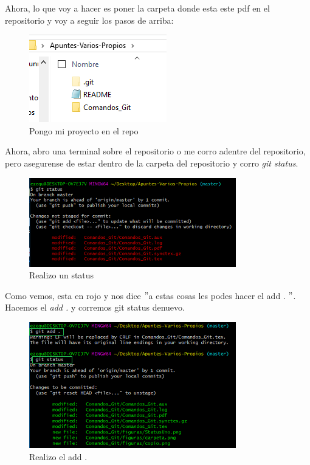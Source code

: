 \documentclass[10pt,journal,compsoc]{IEEEtran}
\begin{document}
Ahora, lo que voy a hacer es poner la carpeta donde esta este pdf en el repositorio y voy a seguir los pasos de arriba:
\begin{figure}[H]
  \begin{center}
	 \includegraphics{figuras/Copio.png}
	 \centering
	 \renewcommand{\arraystretch}{1.3}
	 \caption{Pongo mi proyecto en el repo}
  \end{center}
\end{figure}
Ahora, abro una terminal sobre el repositorio o me corro adentre del repositorio, pero asegurense de estar dentro de la carpeta del repositorio y corro \textit{git status}.
\begin{figure}[H]
  \begin{center}
	 \includegraphics{figuras/StatusUno.png}
	 \centering
	 \renewcommand{\arraystretch}{1.3}
	 \caption{Realizo un status}
  \end{center}
\end{figure}
Como vemos, esta en rojo y nos dice $"$a estas cosas les podes hacer el add . $"$. Hacemos el \textit{add .} y corremos git status denuevo.
\begin{figure}[H]
  \begin{center}
	 \includegraphics{figuras/add.png}
	 \centering
	 \renewcommand{\arraystretch}{1.3}
	 \caption{Realizo el add .}
  \end{center}
\end{figure}
\end{document}
